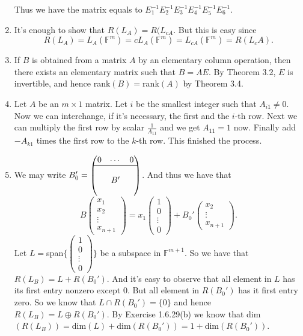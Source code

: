 \begin{enumerate}
Thus we have the matrix equals to $E_1^{-1}E_2^{-1}E_3^{-1}E_4^{-1}E_5^{-1}E_6^{-1}$.
\item It's enough to show that $R(L_A)=R(L_{cA}$. But this is easy since 
\[R(L_A)=L_A(\mathbb{F}^m)=cL_A(\mathbb{F}^m)=L_{cA}(\mathbb{F}^m)=R(L_cA).\]
\item If $B$ is obtained from a matrix $A$ by an elementary column operation, then there exists an elementary matrix such that $B=AE$. By Theorem 3.2, $E$ is invertible, and hence rank$(B)=$rank$(A)$ by Theorem 3.4.
\item Let $A$ be an $m\times 1$ matrix. Let $i$ be the smallest integer such that $A_{i1}\neq 0$. Now we can interchange, if it's necessary, the first and the $i$-th row. Next we can multiply the first row by scalar $\frac{1}{A_{11}}$ and we get $A_{11}=1$ now. Finally add $-A_{k1}$ times the first row to the $k$-th row. This finished the process.
\item We may write $B_0'=\begin{pmatrix}0&\cdots &0\\\hline &&\\&B'&\\&&\end{pmatrix}$. And thus we have that 
\[B\begin{pmatrix}x_1\\x_2\\\vdots \\x_{n+1}\end{pmatrix}=x_1\begin{pmatrix}1\\0\\\vdots \\0\end{pmatrix}+B_0'\begin{pmatrix}x_2\\\vdots \\x_{n+1}\end{pmatrix}.\]
Let $L=$span$\{\begin{pmatrix}1\\0\\\vdots \\0\end{pmatrix}\}$ be a subspace in $\mathbb{F}^{m+1}$. So we have that $R(L_B)=L+R(B_0')$. And it's easy to observe that all element in $L$ has its first entry nonzero except $0$. But all element in $R(B_0')$ has it first entry zero. So we know that $L\cap R(B_0')=\{0\}$ and hence $R(L_B)=L\oplus R(B_0')$. By Exercise 1.6.29(b) we know that dim$(R(L_B))=$dim$(L)+$dim$(R(B_0'))=1+$dim$(R(B_0'))$. 


\end{enumerate}
